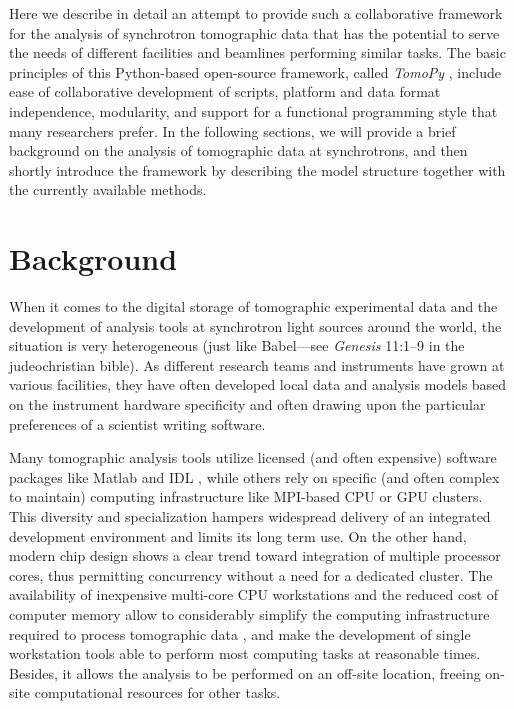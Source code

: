 \documentclass[pdf]{iucr}              %
\begin{document}
Here we describe in detail an attempt to provide such a collaborative framework for the analysis of synchrotron tomographic data that has the potential to serve the needs of different facilities and beamlines performing similar tasks. The basic principles of this Python-based open-source framework, called {\it TomoPy} \cite{python_cpp}, include ease of collaborative development of scripts, platform and data format independence, modularity,  and support for a functional programming style that many researchers prefer. In the following sections, we will provide a brief background on the analysis of tomographic data at synchrotrons, and then shortly introduce the framework by describing the model structure together with the currently available methods. 


\section{Background}

When it comes to the digital storage of tomographic experimental data and the development of analysis tools at synchrotron light sources around the world, the situation is very heterogeneous (just like Babel---see \emph{Genesis} 11:1--9 in the judeochristian bible). As different research teams and instruments have grown at various facilities, they have often developed local data and analysis models based on the instrument hardware specificity and often drawing upon the particular preferences of a scientist writing software. 

Many tomographic analysis tools utilize licensed (and often expensive) software packages like Matlab \cite{matlab} and IDL \cite{exelis_vis}, while others rely on specific (and often complex to maintain) computing infrastructure like MPI-based CPU or GPU clusters. This diversity and specialization hampers widespread delivery of an integrated development environment and limits its long term use. On the other hand, modern chip design shows a clear trend toward integration of multiple processor cores, thus permitting concurrency without a need for a dedicated cluster. The availability of inexpensive multi-core CPU workstations and the reduced cost of computer memory allow to considerably simplify the computing infrastructure required to process tomographic data \cite{rivers_spie_2012}, and make the development of single workstation tools able to perform most computing tasks at reasonable times. Besides, it allows the analysis to be performed on an off-site location, freeing on-site computational resources for other tasks. 
\end{document}
